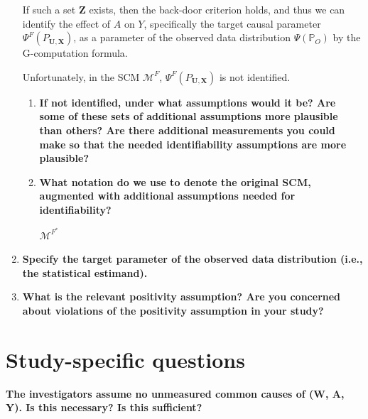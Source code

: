 \documentclass{article}\usepackage[]{graphicx}\usepackage[]{xcolor}
\begin{document}
\begin{enumerate}[label=\textbf{\arabic*.}]
If such a set $\bm{Z}$ exists, then the back-door criterion holds, and thus we can identify the effect of $A$ on $Y$, specifically the target causal parameter $\Psi^F(P_{\bm{U},\bm{X}})$, as a parameter of the observed data distribution $\Psi(\mathbb{P}_O)$ by the G-computation formula.
  
Unfortunately, in the SCM $\mathcal{M}^{F}$, $\Psi^F(P_{\bm{U},\bm{X}})$ is not identified.
  
  \begin{enumerate}[label=\textbf{(\alph*)}]
  
    \item \textbf{If not identified, under what assumptions would it be? Are some of these sets of additional assumptions more plausible than others? Are there additional measurements you could make so that the needed identifiability assumptions are more plausible?}
    
    \item \textbf{What notation do we use to denote the original SCM, augmented with additional assumptions needed for identifiability?}
    
    $\mathcal{M}^{F^*}$
    
  \end{enumerate}
  
  \item \textbf{Specify the target parameter of the observed data distribution (i.e., the statistical estimand).}
  
  \item \textbf{What is the relevant positivity assumption? Are you concerned about violations of the positivity assumption in your study?}
  
\end{enumerate}

\setlength{\leftskip}{0cm}

\section{Study-specific questions}

\setlength{\leftskip}{0.8cm}

\textbf{The investigators assume no unmeasured common causes of (W, A, Y). Is this necessary? Is this sufficient?} 

\setlength{\leftskip}{0cm}
      
  
\end{document}
